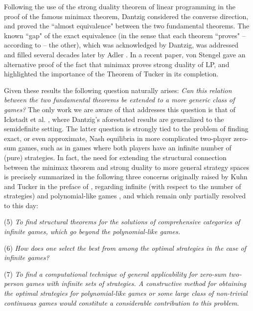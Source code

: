 \documentclass[11pt, twoside]{article}
\numberwithin{equation}{section}
\theoremstyle{definition}
\begin{document}
Following the use of the strong duality theorem of linear programming in the proof of the famous minimax theorem, Dantzig \cite{dantzig1951proof} considered the converse direction, and proved the ``almost equivalence" between the two fundamental theorems. The known ``gap" of the exact equivalence (in the sense that each theorem ``proves" -- according to \cite{von2024zero} -- the other), which was acknowledged by Dantzig, was addressed and filled several decades later by Adler \cite{adler2013equivalence}. In a recent paper, von Stengel \cite{von2024zero} gave an alternative proof of the fact that minimax proves strong duality of LP, and highlighted the importance of the Theorem of Tucker \cite{kuhn1956linear} in its completion.\par

Given these results the following question naturally arises: \textit{Can this relation between the two fundamental theorems be extended to a more generic class of games?} The only work we are aware of that addresses this question is that of Ickstadt et al. \cite{ickstadt2024semidefinite}, where Dantzig's aforestated results are generalized to the semidefinite setting. The latter question is strongly tied to the problem of finding exact, or even approximate, Nash equilibria in more complicated two-player zero-sum games, such as in games where both players have an infinite number of (pure) strategies. In fact, the need for extending the structural connection between the minimax theorem and strong duality to more general strategy spaces is precisely summarized in the following three concerns originally raised by Kuhn and Tucker in the preface of \cite{kuhn1953contributions}, regarding infinite (with respect to the number of strategies) and polynomial-like games \cite{dresher1950polynomial}, and which remain only partially resolved to this day:\quad\vspace{0.2cm}\par
 (5) \textit{To find structural theorems for the solutions of
comprehensive categories of infinite games, which go
beyond the polynomial-like games.}\vspace{-0.1cm}\par
 (6) \textit{How does one select the best from among the optimal
strategies in the case of infinite games?}\vspace{-0.1cm}\par
 (7) \textit{To find a computational technique of general applicability
for zero-sum two-person games with infinite
sets of strategies. A constructive method for
obtaining the optimal strategies for polynomial-like
games or some large class of non-trivial continuous
games would constitute a considerable contribution to
this problem.}
\end{document}
